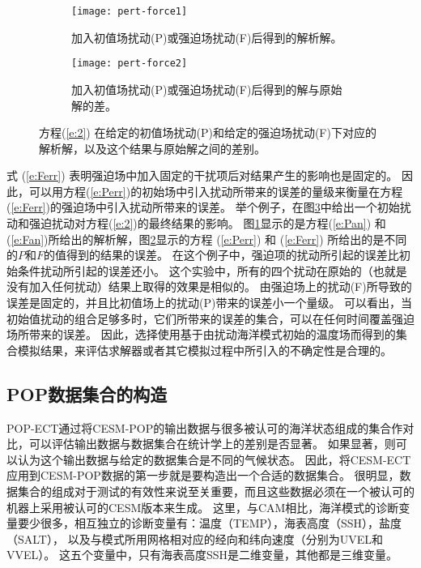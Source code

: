 \begin {figure} 
\centering
\begin{subfigure}[t]{1\textwidth}
\centering
\texttt{[image: pert-force1]}
\caption{加入初值场扰动(P)或强迫场扰动(F)后得到的解析解。\label{fig:1Danalytical1}}
\vspace{10pt}
\end{subfigure}
\begin{subfigure}[b]{1\textwidth}
\centering
\texttt{[image: pert-force2]}
\caption{加入初值场扰动(P)或强迫场扰动(F)后得到的解与原始解的差。\label{fig:1Danalytical2}}
\vspace{10pt}
\end{subfigure}
\caption{方程(\ref{e:2}) 在给定的初值场扰动(P)和给定的强迫场扰动(F)下对应的解析解，以及这个结果与原始解之间的差别。}
\label{fig:1Danalytical}
\end {figure}

式 (\ref{e:Ferr}) 表明强迫场中加入固定的干扰项后对结果产生的影响也是固定的。
因此，可以用方程(\ref{e:Perr})的初始场中引入扰动所带来的误差的量级来衡量在方程(\ref{e:Ferr})的强迫场中引入扰动所带来的误差。 
举个例子，在图\ref{fig:1Danalytical}中给出一个初始扰动和强迫扰动对方程(\ref{e:2})的最终结果的影响。
图\ref{fig:1Danalytical1}显示的是方程(\ref{e:Pan}) 和 (\ref{e:Fan})所给出的解析解，图\ref{fig:1Danalytical2}显示的方程 (\ref{e:Perr}) 和 (\ref{e:Ferr}) 所给出的是不同的$P$和$F$的值得到的结果的误差。
在这个例子中，强迫项的扰动所引起的误差比初始条件扰动所引起的误差还小。
这个实验中，所有的四个扰动在原始的（也就是没有加入任何扰动）结果上取得的效果是相似的。 
由强迫场上的扰动(F)所导致的误差是固定的，并且比初值场上的扰动(P)带来的误差小一个量级。
可以看出，当初始值扰动的组合足够多时，它们所带来的误差的集合，可以在任何时间覆盖强迫场所带来的误差。 
因此，选择使用基于由扰动海洋模式初始的温度场而得到的集合模拟结果，来评估求解器或者其它模拟过程中所引入的不确定性是合理的。



\subsection{POP数据集合的构造}\label{verify:createEns}

 
POP-ECT通过将CESM-POP的输出数据与很多被认可的海洋状态组成的集合作对比，可以评估输出数据与数据集合在统计学上的差别是否显著。
如果显著，则可以认为这个输出数据与给定的数据集合是不同的气候状态。 
因此，将CESM-ECT应用到CESM-POP数据的第一步就是要构造出一个合适的数据集合。 
很明显，数据集合的组成对于测试的有效性来说至关重要，而且这些数据必须在一个被认可的机器上采用被认可的CESM版本来生成。
这里，与CAM相比，海洋模式的诊断变量要少很多，相互独立的诊断变量有：温度（TEMP），海表高度（SSH），盐度（SALT）， 以及与模式所用网格相对应的经向和纬向速度（分别为UVEL和VVEL）。
这五个变量中，只有海表高度SSH是二维变量，其他都是三维变量。 

